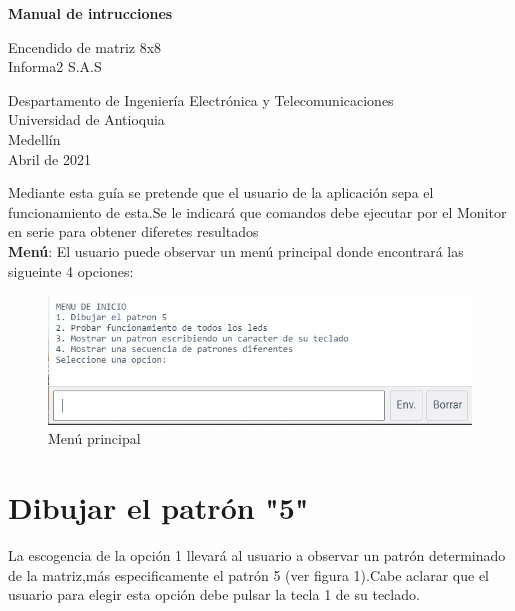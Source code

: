 \documentclass{article}
\begin{document}
\begin{titlepage}
    \begin{center}
        \vspace*{4cm}
            
        \Huge
        \textbf{Manual de intrucciones}
            
        \vspace{0.5cm}
        \LARGE
        Encendido de matriz 8x8\\ Informa2 S.A.S
            
        \vspace{1.5cm}
            
  
            
        \vfill
            
        \vspace{0.8cm}
            
        \Large
        Despartamento de Ingeniería Electrónica y Telecomunicaciones\\
        Universidad de Antioquia\\
        Medellín\\
        Abril de 2021
            
    \end{center}
\end{titlepage}

\tableofcontents
\newpage

 Mediante esta guía se pretende que el usuario de la aplicación sepa el funcionamiento de esta.Se le indicará que comandos debe ejecutar por el Monitor en serie para obtener diferetes resultados\\

\textbf{Menú}: El usuario puede observar un menú principal 
donde encontrará las sigueinte 4 opciones:

    \begin{figure}[h]
    \includegraphics[width=13cm]{menu.jpeg}
    \centering
    \caption{Menú principal}
    \label{menu}
    \end{figure}

\section{Dibujar el patrón "5"}\label{op1}
La escogencia de la opción 1 llevará al usuario a observar un patrón determinado de la matriz,más especificamente el patrón 5 (ver figura 1).Cabe aclarar que el usuario para elegir esta opción debe pulsar la tecla 1 de su teclado.
\end{document}
